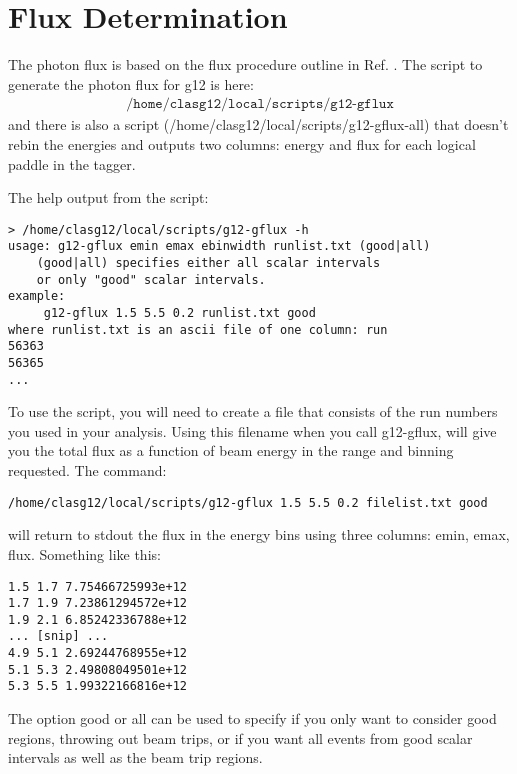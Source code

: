 \section{Flux Determination}

The photon flux is based on the flux procedure outline in Ref. \cite{clas.flux.note}. The script to generate the photon flux for g12 is here:
\begin{align}
    \texttt{/home/clasg12/local/scripts/g12-gflux} \nonumber
\end{align} and there is also a script (/home/clasg12/local/scripts/g12-gflux-all) that doesn't rebin the energies and outputs two columns: energy and flux for each logical paddle in the tagger.

The help output from the script:
\begin{verbatim}
> /home/clasg12/local/scripts/g12-gflux -h
usage: g12-gflux emin emax ebinwidth runlist.txt (good|all)
    (good|all) specifies either all scalar intervals
    or only "good" scalar intervals.
example:
     g12-gflux 1.5 5.5 0.2 runlist.txt good
where runlist.txt is an ascii file of one column: run
56363
56365
...
\end{verbatim}

To use the script, you will need to create a file that consists of the run numbers you used in your analysis. Using this filename when you call g12-gflux, will give you the total flux as a function of beam energy in the range and binning requested. The command:
\begin{verbatim}
/home/clasg12/local/scripts/g12-gflux 1.5 5.5 0.2 filelist.txt good
\end{verbatim}

will return to stdout the flux in the energy bins using three columns: emin, emax, flux. Something like this:
\begin{verbatim}
1.5 1.7 7.75466725993e+12
1.7 1.9 7.23861294572e+12
1.9 2.1 6.85242336788e+12
... [snip] ...
4.9 5.1 2.69244768955e+12
5.1 5.3 2.49808049501e+12
5.3 5.5 1.99322166816e+12
\end{verbatim}

The option good or all can be used to specify if you only want to consider good regions, throwing out beam trips, or if you want all events from good scalar intervals as well as the beam trip regions.

